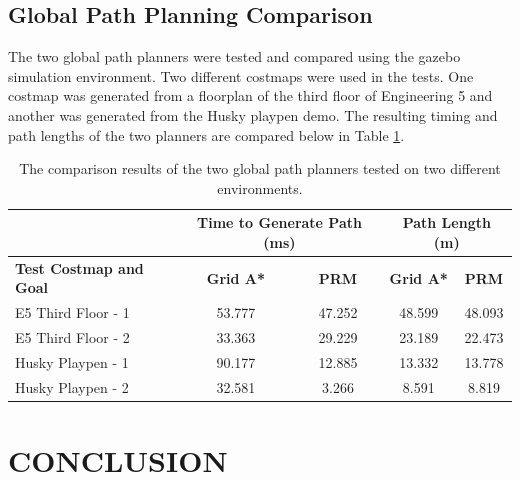 \documentclass[letterpaper, 10 pt, conference]{ieeeconf}  %
\begin{document}
\subsection{Global Path Planning Comparison}

The two global path planners were tested and compared using the gazebo simulation environment. Two different costmaps were used in the tests. One costmap was generated from a floorplan of the third floor of Engineering 5 and another was generated from the Husky playpen demo. The resulting timing and path lengths of the two planners are compared below in Table \ref{compare_table}.  

\begin{table}[h]
\caption{The comparison results of the two global path planners tested on two different environments.}
\label{compare_table}
\begin{center}
\begin{tabular}{l|c|c|c|c|}
\cline{2-5}
                                    & \multicolumn{2}{c|}{\textbf{Time to Generate Path (ms)}} & \multicolumn{2}{c|}{\textbf{Path Length (m)}} \\ \hline
\multicolumn{1}{|l|}{\textbf{Test Costmap and Goal}} & \textbf{Grid A*}    & \textbf{PRM}    & \textbf{Grid A*}     & \textbf{PRM}     \\ \hline
\multicolumn{1}{|l|}{E5 Third Floor - 1} & 53.777 & 47.252 & 48.599 & 48.093 \\ \hline
\multicolumn{1}{|l|}{E5 Third Floor - 2} & 33.363 & 29.229 & 23.189 & 22.473 \\ \hline
\multicolumn{1}{|l|}{Husky Playpen - 1} & 90.177 & 12.885 & 13.332 & 13.778 \\ \hline
\multicolumn{1}{|l|}{Husky Playpen - 2} & 32.581 & 3.266 & 8.591 & 8.819 \\ \hline
\end{tabular}
\end{center}
\end{table}


\section{CONCLUSION}
\end{document}

